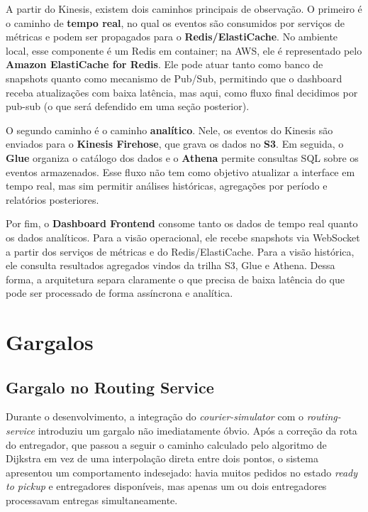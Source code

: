 ﻿\documentclass{article}
\begin{document}
A partir do Kinesis, existem dois caminhos principais de observa\c{c}\~ao. O primeiro \'e o caminho de \textbf{tempo real}, no qual os eventos s\~ao consumidos por servi\c{c}os de m\'etricas e podem ser propagados para o \textbf{Redis/ElastiCache}. No ambiente local, esse componente \'e um Redis em container; na AWS, ele \'e representado pelo \textbf{Amazon ElastiCache for Redis}. Ele pode atuar tanto como banco de snapshots quanto como mecanismo de Pub/Sub, permitindo que o dashboard receba atualiza\c{c}\~oes com baixa lat\^encia, mas aqui, como fluxo final decidimos por pub-sub (o que será defendido em uma seção posterior).

O segundo caminho \'e o caminho \textbf{anal\'itico}. Nele, os eventos do Kinesis s\~ao enviados para o \textbf{Kinesis Firehose}, que grava os dados no \textbf{S3}. Em seguida, o \textbf{Glue} organiza o cat\'alogo dos dados e o \textbf{Athena} permite consultas SQL sobre os eventos armazenados. Esse fluxo n\~ao tem como objetivo atualizar a interface em tempo real, mas sim permitir an\'alises hist\'oricas, agrega\c{c}\~oes por per\'iodo e relat\'orios posteriores.

Por fim, o \textbf{Dashboard Frontend} consome tanto os dados de tempo real quanto os dados anal\'iticos. Para a vis\~ao operacional, ele recebe snapshots via WebSocket a partir dos servi\c{c}os de m\'etricas e do Redis/ElastiCache. Para a vis\~ao hist\'orica, ele consulta resultados agregados vindos da trilha S3, Glue e Athena. Dessa forma, a arquitetura separa claramente o que precisa de baixa lat\^encia do que pode ser processado de forma ass\'incrona e anal\'itica.

\section{Gargalos}

\subsection{Gargalo no Routing Service}

Durante o desenvolvimento, a integração do \textit{courier-simulator} com o \textit{routing-service} introduziu um gargalo não imediatamente óbvio. Após a correção da rota do entregador, que passou a seguir o caminho calculado pelo algoritmo de Dijkstra em vez de uma interpolação direta entre dois pontos, o sistema apresentou um comportamento indesejado: havia muitos pedidos no estado \textit{ready to pickup} e entregadores disponíveis, mas apenas um ou dois entregadores processavam entregas simultaneamente.
\end{document}
